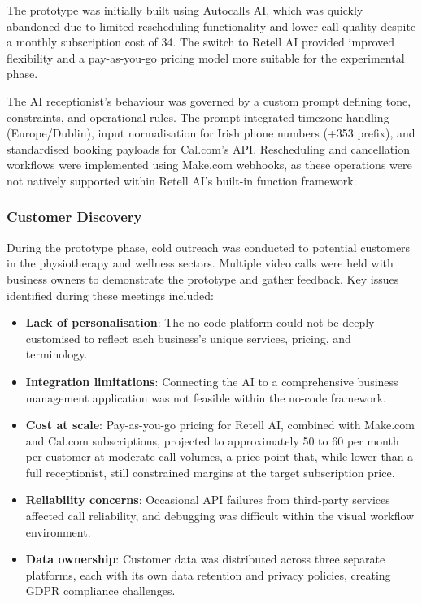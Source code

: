 \documentclass[conference]{IEEEtran}
\begin{document}
The prototype was initially built using Autocalls AI, which was quickly abandoned due to limited rescheduling functionality and lower call quality despite a monthly subscription cost of \texteuro{}34. The switch to Retell AI provided improved flexibility and a pay-as-you-go pricing model more suitable for the experimental phase.

The AI receptionist's behaviour was governed by a custom prompt defining tone, constraints, and operational rules. The prompt integrated timezone handling (Europe/Dublin), input normalisation for Irish phone numbers (+353 prefix), and standardised booking payloads for Cal.com's API. Rescheduling and cancellation workflows were implemented using Make.com webhooks, as these operations were not natively supported within Retell AI's built-in function framework.

\subsubsection{Customer Discovery}

During the prototype phase, cold outreach was conducted to potential customers in the physiotherapy and wellness sectors. Multiple video calls were held with business owners to demonstrate the prototype and gather feedback. Key issues identified during these meetings included:

\begin{itemize}
\item \textbf{Lack of personalisation}: The no-code platform could not be deeply customised to reflect each business's unique services, pricing, and terminology.
\item \textbf{Integration limitations}: Connecting the AI to a comprehensive business management application was not feasible within the no-code framework.
\item \textbf{Cost at scale}: Pay-as-you-go pricing for Retell AI, combined with Make.com and Cal.com subscriptions, projected to approximately \texteuro{}50 to \texteuro{}60 per month per customer at moderate call volumes, a price point that, while lower than a full receptionist, still constrained margins at the target subscription price.
\item \textbf{Reliability concerns}: Occasional API failures from third-party services affected call reliability, and debugging was difficult within the visual workflow environment.
\item \textbf{Data ownership}: Customer data was distributed across three separate platforms, each with its own data retention and privacy policies, creating GDPR compliance challenges.
\end{itemize}
\end{document}
